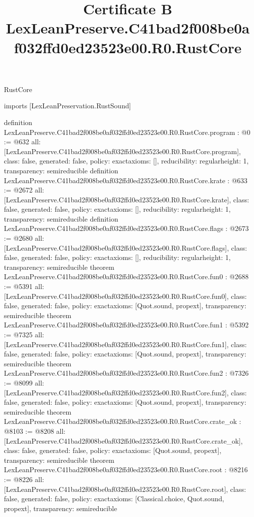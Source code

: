 \begin{lexlean}{RustCore}
\title{Certificate B LexLeanPreserve.C41bad2f008be0af032ffd0ed23523e00.R0.RustCore}
\begin{coremodule}
imports [LexLeanPreservation.RustSound]

definition LexLeanPreserve.C41bad2f008be0af032ffd0ed23523e00.R0.RustCore.program : @0 := @632 {
  all: [LexLeanPreserve.C41bad2f008be0af032ffd0ed23523e00.R0.RustCore.program],
  class: false,
  generated: false,
  policy: exact{axioms: []},
  reducibility: regular{height: 1},
  transparency: semireducible
}
definition LexLeanPreserve.C41bad2f008be0af032ffd0ed23523e00.R0.RustCore.krate : @633 := @2672 {
  all: [LexLeanPreserve.C41bad2f008be0af032ffd0ed23523e00.R0.RustCore.krate],
  class: false,
  generated: false,
  policy: exact{axioms: []},
  reducibility: regular{height: 1},
  transparency: semireducible
}
definition LexLeanPreserve.C41bad2f008be0af032ffd0ed23523e00.R0.RustCore.flags : @2673 := @2680 {
  all: [LexLeanPreserve.C41bad2f008be0af032ffd0ed23523e00.R0.RustCore.flags],
  class: false,
  generated: false,
  policy: exact{axioms: []},
  reducibility: regular{height: 1},
  transparency: semireducible
}
theorem LexLeanPreserve.C41bad2f008be0af032ffd0ed23523e00.R0.RustCore.fun0 : @2688 := @5391 {
  all: [LexLeanPreserve.C41bad2f008be0af032ffd0ed23523e00.R0.RustCore.fun0],
  class: false,
  generated: false,
  policy: exact{axioms: [Quot.sound, propext]},
  transparency: semireducible
}
theorem LexLeanPreserve.C41bad2f008be0af032ffd0ed23523e00.R0.RustCore.fun1 : @5392 := @7325 {
  all: [LexLeanPreserve.C41bad2f008be0af032ffd0ed23523e00.R0.RustCore.fun1],
  class: false,
  generated: false,
  policy: exact{axioms: [Quot.sound, propext]},
  transparency: semireducible
}
theorem LexLeanPreserve.C41bad2f008be0af032ffd0ed23523e00.R0.RustCore.fun2 : @7326 := @8099 {
  all: [LexLeanPreserve.C41bad2f008be0af032ffd0ed23523e00.R0.RustCore.fun2],
  class: false,
  generated: false,
  policy: exact{axioms: [Quot.sound, propext]},
  transparency: semireducible
}
theorem LexLeanPreserve.C41bad2f008be0af032ffd0ed23523e00.R0.RustCore.crate_ok : @8103 := @8208 {
  all: [LexLeanPreserve.C41bad2f008be0af032ffd0ed23523e00.R0.RustCore.crate_ok],
  class: false,
  generated: false,
  policy: exact{axioms: [Quot.sound, propext]},
  transparency: semireducible
}
theorem LexLeanPreserve.C41bad2f008be0af032ffd0ed23523e00.R0.RustCore.root : @8216 := @8226 {
  all: [LexLeanPreserve.C41bad2f008be0af032ffd0ed23523e00.R0.RustCore.root],
  class: false,
  generated: false,
  policy: exact{axioms: [Classical.choice, Quot.sound, propext]},
  transparency: semireducible
}


\end{coremodule}
\end{lexlean}
